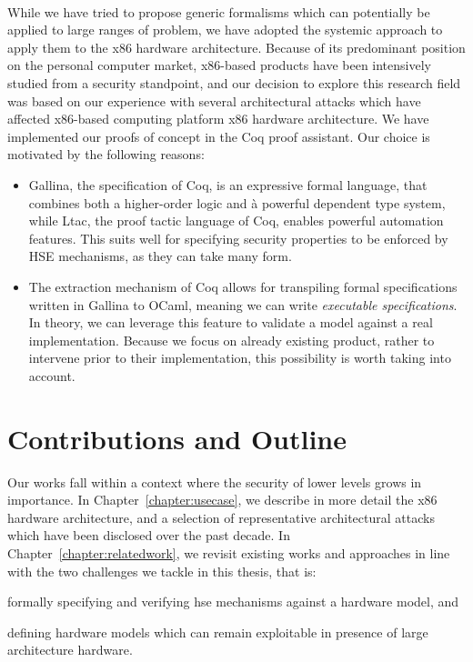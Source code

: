 \paragraph{}
%
While we have tried to propose generic formalisms which can potentially be
applied to large ranges of problem, we have adopted the systemic approach to
apply them to the x86 hardware architecture.
%
Because of its predominant position on the personal computer market, x86-based
products have been intensively studied from a security standpoint, and our
decision to explore this research field was based on our experience with several
architectural attacks which have affected x86-based computing platform x86
hardware architecture.
%
We have implemented our proofs of concept in the Coq proof assistant.
%
Our choice is motivated by the following reasons:
%
\begin{itemize}
\item {\sc Gallina}, the specification of Coq, is an expressive formal language,
  that combines both a higher-order logic and à powerful dependent type system,
  while {\sc Ltac}, the proof tactic language of Coq, enables powerful
  automation features.
  This suits well for specifying security properties to be enforced by HSE
  mechanisms, as they can take many form.
\item The extraction mechanism of Coq allows for transpiling formal
  specifications written in {\sc Gallina} to OCaml, meaning we can write
  \emph{executable specifications}.
  In theory, we can leverage this feature to validate a model against a real
  implementation.
  Because we focus on already existing product, rather to intervene prior to
  their implementation, this possibility is worth taking into account.
\end{itemize}

\section{Contributions and Outline}

Our works fall within a context where the security of lower levels grows in
importance.
%
In Chapter~\ref{chapter:usecase}, we describe in more detail the x86 hardware
architecture, and a selection of representative architectural attacks which have
been disclosed over the past decade.
%
In Chapter~\ref{chapter:relatedwork}, we revisit existing works and approaches
in line with the two challenges we tackle in this thesis, that is:
%
\begin{inparaenum}[(1)]
\item formally specifying and verifying \ac{hse} mechanisms against a hardware
  model, and
%
\item defining hardware models which can remain exploitable in presence of large
  architecture hardware.
\end{inparaenum}

